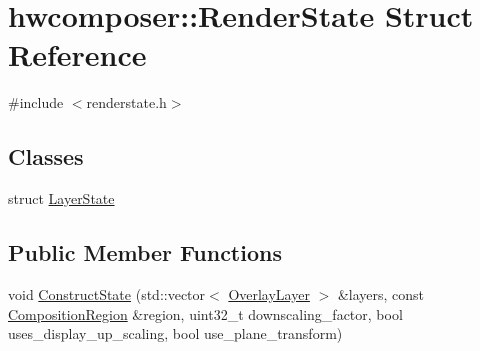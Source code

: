 \hypertarget{structhwcomposer_1_1RenderState}{}\section{hwcomposer\+:\+:Render\+State Struct Reference}
\label{structhwcomposer_1_1RenderState}


{\ttfamily \#include $<$renderstate.\+h$>$}

\subsection*{Classes}
\begin{DoxyCompactItemize}
\item 
struct \mbox{\hyperlink{structhwcomposer_1_1RenderState_1_1LayerState}{Layer\+State}}
\end{DoxyCompactItemize}
\subsection*{Public Member Functions}
\begin{DoxyCompactItemize}
\item 
void \mbox{\hyperlink{structhwcomposer_1_1RenderState_a52c9a4e17e61f8805f462a815bbe614e}{Construct\+State}} (std\+::vector$<$ \mbox{\hyperlink{structhwcomposer_1_1OverlayLayer}{Overlay\+Layer}} $>$ \&layers, const \mbox{\hyperlink{structhwcomposer_1_1CompositionRegion}{Composition\+Region}} \&region, uint32\+\_\+t downscaling\+\_\+factor, bool uses\+\_\+display\+\_\+up\+\_\+scaling, bool use\+\_\+plane\+\_\+transform)
\end{DoxyCompactItemize}
